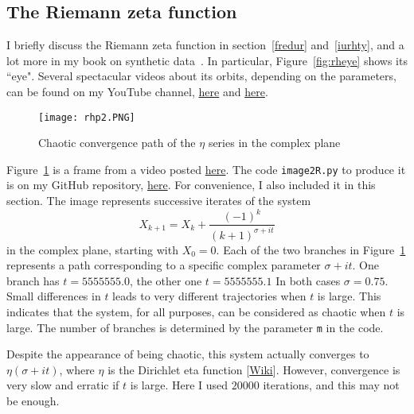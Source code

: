 \documentclass[oneside,10pt]{book}
\begin{document}

\subsection{The Riemann zeta function}

I briefly discuss the Riemann zeta function in section~\ref{fredur}
 and~\ref{iurhty}, and a lot more in my book on synthetic data~\cite{vgsynthetic}. In particular, Figure~\ref{fig:rheye} shows its ``eye".
 Several spectacular videos about its orbits, depending on the parameters, can be
 found on my YouTube channel, \href{https://www.youtube.com/watch?v=MDBaJ8RsLA8}{here}
 and \href{https://www.youtube.com/watch?v=9IdkvifRFgU}{here}.

\begin{figure}[H]
\centering
\texttt{[image: rhp2.PNG]} %
\caption{Chaotic convergence path of the $\eta$ series in the complex plane}
\label{gholgurew}
\end{figure}

Figure~\ref{gholgurew}  is a frame from a
  video  posted \href{https://www.youtube.com/watch?v=XI5MhyNc7us}{here}. The code
 \texttt{image2R.py}
 to produce it is on my GitHub repository, \href{https://github.com/VincentGranville/Visualizations/blob/main/Source-Code/image2R.py}{here}. For convenience, I also included it in this section. The image represents successive iterates of the system
$$X_{k+1} = X_{k} + \frac{(-1)^{k}} {(k+1)^{\sigma+ it}}$$
in the complex plane, starting with $X_0 = 0$. Each of the two branches in Figure~\ref{gholgurew} represents a path corresponding to a specific
 complex parameter $\sigma + it$. One branch has $t=5555555.0$, the other one $t=5555555.1$ In both cases
 $\sigma=0.75$. Small differences in $t$ leads to very different trajectories when $t$ is large. This indicates that
 the system, for all purposes, can be considered as chaotic when $t$ is large. The number of branches is determined by the parameter \texttt{m} in the code.

Despite the appearance of being chaotic, this system actually converges to $\eta(\sigma+it)$, where
 $\eta$ is the \textcolor{index}{Dirichlet eta function} [\href{https://en.wikipedia.org/wiki/Dirichlet_eta_function}{Wiki}]. However, convergence is very slow and erratic if $t$ is large. Here I used $\num{20000}$ iterations, and this may not be enough. \vspace{1ex}
\end{document}
